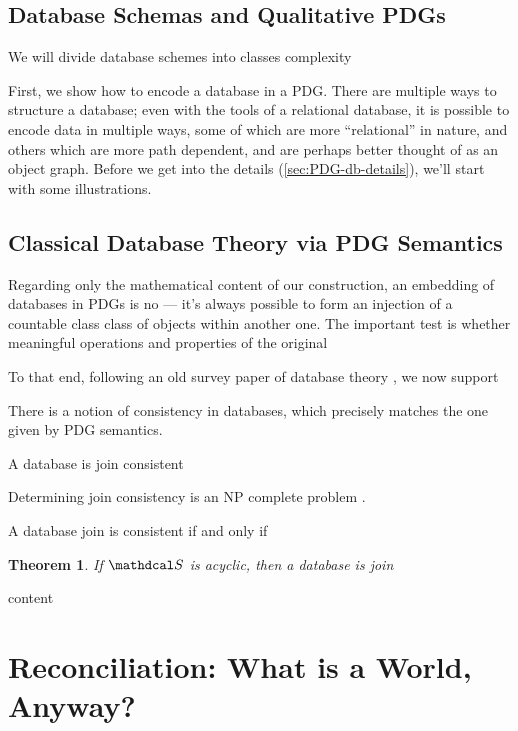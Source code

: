 \documentclass{article}
\theoremstyle{plain}
\newtheorem{theorem}{Theorem}%
\theoremstyle{definition}
\theoremstyle{remark}
\newcommand{\sch}{\mathdcal S}%
\begin{document}
\subsection{Database Schemas and Qualitative PDGs}

We will divide database schemes into classes complexity



First, we show how to encode a database in a PDG. There are multiple ways to structure a database; even with the tools of a relational database, it is possible to encode data in multiple ways, some of which are more ``relational'' in nature, and others which are more path dependent, and are perhaps better thought of as an object graph. 
Before we get into the details (\cref{sec:PDG-db-details}), we'll start with some illustrations. 


\subsection{Classical Database Theory via PDG Semantics}
Regarding only the mathematical content of our construction, an embedding of databases in PDGs is no --- it's always possible to form an injection of a countable class class of objects within another one. The important test is whether meaningful operations and properties of the original 

To that end, following an old survey paper of database theory \cite{fagin1986theory}, we now support 


There is a notion of consistency in databases, which precisely matches the one given by PDG semantics.
\begin{defn}
	A database is join consistent
\end{defn}

Determining join consistency is an NP complete problem \cite{HLY in fagin1986theory}.

\begin{defn}
	A database join is consistent if and only if
\end{defn}
\begin{theorem}
	If $\sch$ is acyclic, then a database is join
\end{theorem}

\begin{defn}
	content
\end{defn}


\section{Reconciliation: What is a World, Anyway?} \label{sec:possible-world}
\end{document}
